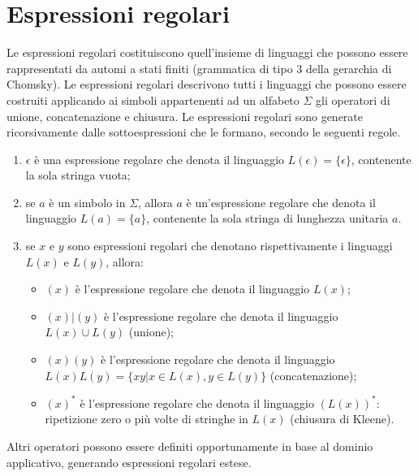 \section{Espressioni regolari}
Le espressioni regolari costituiscono quell'insieme di linguaggi che possono essere rappresentati da automi a stati finiti (grammatica di tipo 3 della gerarchia di Chomsky). Le espressioni regolari descrivono tutti i linguaggi che possono essere costruiti applicando ai simboli appartenenti ad un alfabeto $\Sigma$ gli operatori di unione, concatenazione e chiusura. Le espressioni regolari sono generate ricorsivamente dalle sottoespressioni che le formano, secondo le seguenti regole.
\begin{enumerate}
\item $\epsilon$ è una espressione regolare che denota il linguaggio $L(\epsilon) = \{\epsilon\}$, 					contenente la sola stringa vuota;
\item se $a$  è un simbolo in $\Sigma$, allora $a$ è un'espressione regolare che denota il linguaggio $L(a) = 	\{a\}$, contenente la sola stringa di lunghezza unitaria $a$.
\item se $x$ e $y$ sono espressioni regolari che denotano rispettivamente i linguaggi $L(x)$ e $L(y)$, allora:
	\begin{itemize}
	\item $(x)$ è l'espressione regolare che denota il linguaggio $L(x)$;
	\item $(x) | (y)$ è l'espressione regolare che denota il linguaggio $L(x) \cup L(y)$ (unione);
	\item $(x)(y)$ è l'espressione regolare che denota il linguaggio $L(x)L(y) = \{xy | x \in L(x), y \in L(y)\}$ (concatenazione);
	\item $(x)^*$ è l'espressione regolare che denota il linguaggio $(L(x))^*$: ripetizione zero o più volte di stringhe in $L(x)$ (chiusura di Kleene).
	\end{itemize}
\end{enumerate}
Altri operatori possono essere definiti opportunamente in base al dominio applicativo, generando espressioni regolari estese.


